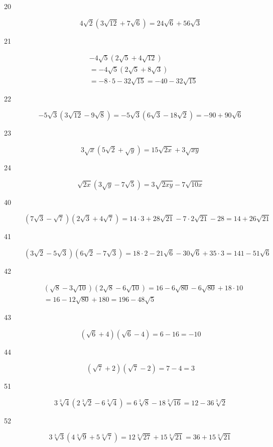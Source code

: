 \documentclass[fleqn,addpoints]{exam}
\begin{document}
\begin{description}
\item[20]
\[
  4\sqrt{2}(3\sqrt{12} + 7\sqrt{6}) = 24\sqrt{6} + 56\sqrt{3}
\]

\item[21]
\begin{align*}
  & -4\sqrt{5}(2\sqrt{5} + 4\sqrt{12}) \\
  &= -4\sqrt{5}(2\sqrt{5} + 8\sqrt{3}) \\
  &= -8 \cdot 5 - 32\sqrt{15} = -40 - 32\sqrt{15}
\end{align*}

\item[22]
\[
  -5\sqrt{3}(3\sqrt{12} - 9\sqrt{8}) = -5\sqrt{3}(6\sqrt{3} - 18\sqrt{2}) = -90 + 90\sqrt{6}
\]

\item[23]
\[
  3\sqrt{x}(5\sqrt{2} + \sqrt{y}) = 15\sqrt{2x} + 3\sqrt{xy}
\]

\item[24]
\[
  \sqrt{2x}(3\sqrt{y} - 7\sqrt{5}) = 3\sqrt{2xy} - 7\sqrt{10x}
\]

\item[40]
\[
  (7\sqrt{3} - \sqrt{7})(2\sqrt{3} + 4\sqrt{7}) = 14 \cdot 3 + 28\sqrt{21} - 7 \cdot 2 \sqrt{21} - 28 = 14 + 26 \sqrt{21}
\]

\item[41]
\[
 (3\sqrt{2} - 5\sqrt{3})(6\sqrt{2} - 7\sqrt{3}) = 18 \cdot 2 - 21\sqrt{6} - 30\sqrt{6} + 35 \cdot 3 = 141 - 51\sqrt{6}
\]

\item[42]
\begin{align*}
  & (\sqrt{8} - 3\sqrt{10})(2\sqrt{8} - 6\sqrt{10}) = 16 - 6\sqrt{80} - 6\sqrt{80} + 18 \cdot 10 \\
  &= 16 - 12\sqrt{80} + 180 = 196 -48\sqrt{5}
\end{align*}

\item[43]
\[
  (\sqrt{6} + 4)(\sqrt{6} - 4) = 6 - 16 = -10
\]

\item[44]
\[
  (\sqrt{7} + 2)(\sqrt{7} - 2) = 7 - 4 = 3
\]

\item[51]
\[
  3\sqrt[3]{4}(2\sqrt[3]{2} - 6\sqrt[3]{4}) = 6\sqrt[3]{8} - 18\sqrt[3]{16} = 12 - 36\sqrt[3]{2}
\]

\item[52]
\[
  3\sqrt[3]{3}(4\sqrt[3]{9} + 5\sqrt[3]{7}) = 12\sqrt[3]{27} + 15\sqrt[3]{21} = 36 + 15\sqrt[3]{21}
\]


\end{description}
\end{document}
